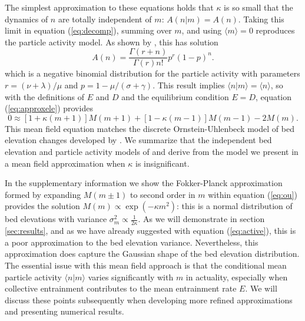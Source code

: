 The simplest approximation to these equations holds that $\kappa$ is so small that the dynamics of $n$ are totally independent of $m$: $A(n|m) = A(n)$. Taking this limit in equation (\ref{eq:decomp}), summing over $m$, and using $\langle m \rangle = 0$ reproduces the \citet{Ancey2008} particle activity model.
As shown by \citet{Ancey2008}, this has solution
\begin{equation} A(n) = \frac{\Gamma(r+n)}{\Gamma(r)n!}p^r(1-p)^n.\label{eq:ancey}\end{equation}
which is a negative binomial distribution for the particle activity with parameters $r=(\nu+\lambda)/\mu$ and $p=1-\mu/(\sigma+\gamma).$
This result implies $\langle n | m \rangle = \langle n \rangle$, so with the definitions of $E$ and $D$ and the equilibrium condition $E=D$, equation (\ref{eq:approxele}) provides
\begin{equation}0 \approx [1+\kappa(m+1)]M(m+1) + [1-\kappa(m-1)]M(m-1)-2M(m). \label{eq:ou} \end{equation}
This mean field equation matches the discrete Ornstein-Uhlenbeck model of bed elevation changes developed by \citet{Martin2014}.
We summarize that the independent bed elevation and particle activity models of \citet{Martin2014} and \citet{Ancey2008} derive from the model we present in a mean field approximation when $\kappa$ is insignificant.

In the supplementary information we show the Fokker-Planck approximation \citep{Gardiner1983} formed by expanding $M(m\pm 1)$ to second order in $m$ within equation (\ref{eq:ou}) provides the solution $M(m) \propto \exp(-\kappa m^2)$: this is a normal distribution of bed elevations with variance $\sigma_m^2 \propto \frac{1}{2\kappa}$.
As we will demonstrate in section \ref{sec:results}, and as we have already suggested with equation (\ref{eq:active}), this is a poor approximation to the bed elevation variance. Nevertheless, this approximation does capture the Gaussian shape of the bed elevation distribution.
The essential issue with this mean field approach is that the conditional mean particle activity $\langle n | m \rangle$ varies significantly with $m$ in actuality, especially when collective entrainment contributes to the mean entrainment rate $E$. We will discuss these points subsequently when developing more refined approximations and presenting numerical results.

